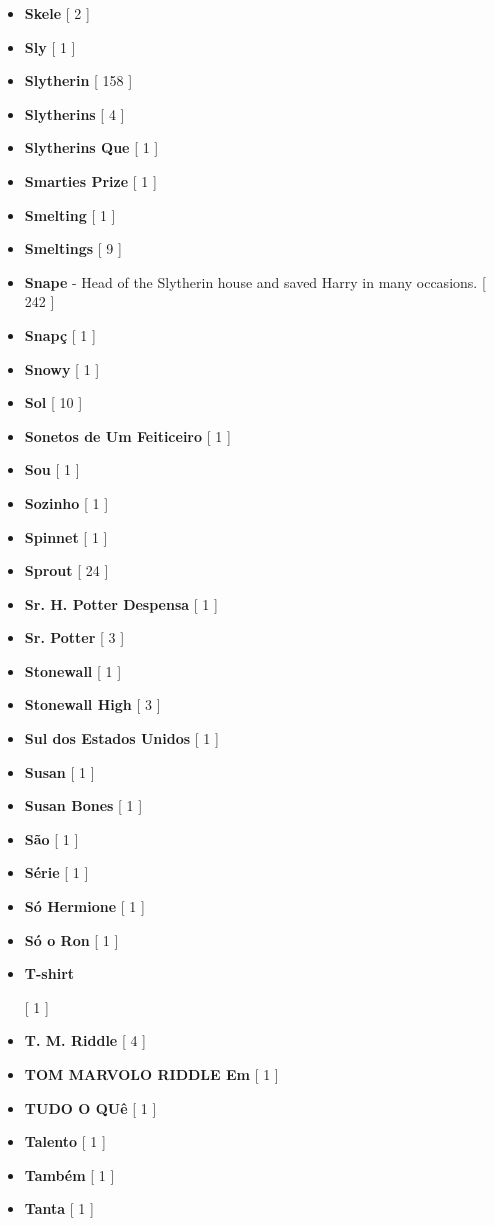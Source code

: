 \documentclass[a4paper]{article}
\begin{document}
{\begin{itemize}
	\item \textbf{Skele} [ 2 ]
	\item \textbf{Sly} [ 1 ]
	\item \textbf{Slytherin} [ 158 ]
	\item \textbf{Slytherins} [ 4 ]
	\item \textbf{Slytherins Que} [ 1 ]
	\item \textbf{Smarties Prize} [ 1 ]
	\item \textbf{Smelting} [ 1 ]
	\item \textbf{Smeltings} [ 9 ]
	\item \textbf{Snape} - Head of the Slytherin house and saved Harry in many occasions. [ 242 ]
	\item \textbf{Snapç} [ 1 ]
	\item \textbf{Snowy} [ 1 ]
	\item \textbf{Sol} [ 10 ]
	\item \textbf{Sonetos de Um Feiticeiro} [ 1 ]
	\item \textbf{Sou} [ 1 ]
	\item \textbf{Sozinho} [ 1 ]
	\item \textbf{Spinnet} [ 1 ]
	\item \textbf{Sprout} [ 24 ]
	\item \textbf{Sr. H. Potter Despensa} [ 1 ]
	\item \textbf{Sr. Potter} [ 3 ]
	\item \textbf{Stonewall} [ 1 ]
	\item \textbf{Stonewall High} [ 3 ]
	\item \textbf{Sul dos Estados Unidos} [ 1 ]
	\item \textbf{Susan} [ 1 ]
	\item \textbf{Susan Bones} [ 1 ]
	\item \textbf{São} [ 1 ]
	\item \textbf{Série} [ 1 ]
	\item \textbf{Só Hermione} [ 1 ]
	\item \textbf{Só o Ron} [ 1 ]
	\item \hypertarget{T}{\textbf{T-shirt}} [ 1 ]
	\item \textbf{T. M. Riddle} [ 4 ]
	\item \textbf{TOM MARVOLO RIDDLE Em} [ 1 ]
	\item \textbf{TUDO O QUê} [ 1 ]
	\item \textbf{Talento} [ 1 ]
	\item \textbf{Também} [ 1 ]
	\item \textbf{Tanta} [ 1 ]

\end{itemize}}
\end{document}
